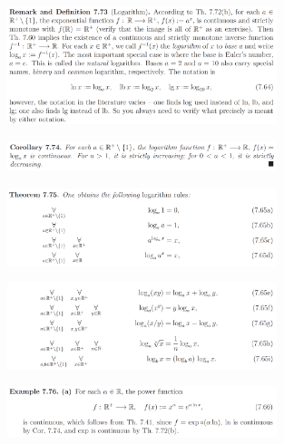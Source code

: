 \begin{figure}[H] \centering
\includegraphics[width=0.7\textwidth]{media/7-29.png}
\end{figure}
\begin{figure}[H] \centering
\includegraphics[width=0.7\textwidth]{media/7-29-2.png}
\end{figure}
\begin{figure}[H] \centering
\includegraphics[width=0.7\textwidth]{media/7-29-3.png}
\end{figure}
\begin{figure}[H] \centering
\includegraphics[width=0.7\textwidth]{media/7-29-4.png}
\end{figure}
\begin{figure}[H] \centering
\includegraphics[width=0.7\textwidth]{media/7-29-5.png}
\end{figure}